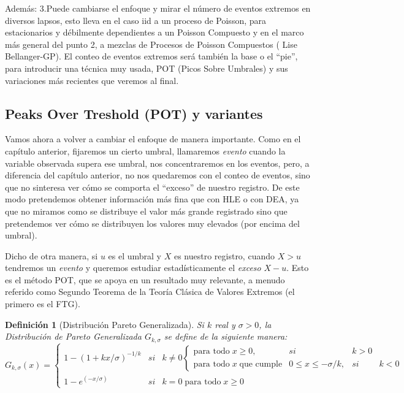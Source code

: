 \documentclass[
  12pt]{article}
\newtheorem{definition}{Definición}[section]
\begin{document}
Además: 3.Puede cambiarse el enfoque y mirar el número de eventos
extremos en diversos lapsos, esto lleva en el caso iid a un proceso de
Poisson, para estacionarios y débilmente dependientes a un Poisson
Compuesto y en el marco más general del punto 2, a mezclas de Procesos
de Poisson Compuestos ( Lise Bellanger-GP). El conteo de eventos
extremos será también la base o el ``pie'', para introducir una técnica
muy usada, POT (Picos Sobre Umbrales) y sus variaciones más recientes
que veremos al final.

\newpage

\subsection{Peaks Over Treshold (POT) y
variantes}\label{peaks-over-treshold-pot-y-variantes}

Vamos ahora a volver a cambiar el enfoque de manera importante. Como en
el capítulo anterior, fijaremos un cierto umbral, llamaremos
\emph{evento} cuando la variable observada supera ese umbral, nos
concentraremos en los eventos, pero, a diferencia del capítulo anterior,
no nos quedaremos con el conteo de eventos, sino que no sinteresa ver
cómo se comporta el ``exceso'' de nuestro registro. De este modo
pretendemos obtener información más fina que con HLE o con DEA, ya que
no miramos como se distribuye el valor más grande registrado sino que
pretendemos ver cómo se distribuyen los valores muy elevados (por encima
del umbral).

Dicho de otra manera, si \(u\) es el umbral y \(X\) es nuestro registro,
cuando \(X>u\) tendremos un \emph{evento} y queremos estudiar
estadísticamente el \emph{exceso} \(X-u\). Esto es el método POT, que se
apoya en un resultado muy relevante, a menudo referido como Segundo
Teorema de la Teoría Clásica de Valores Extremos (el primero es el FTG).

\begin{definition}[Distribución Pareto Generalizada]
Si $k$ real y $\sigma>0$, la Distribución de Pareto Generalizada $G_{k,\sigma}$ se define de la siguiente manera:\\
\begin{equation}
G_{k,\sigma}(x)=\left\{\begin{matrix}
 1-(1+kx/\sigma)^{-1/k}& si & k\neq 0 \left\{\begin{matrix}
\text{para todo} \;x\geq 0 , & si & k>0\\ 
\text{para todo}\; x \;\text{que cumple}&
0\leq x \leq  -\sigma/k, &si& k<0
\end{matrix}\right.\\ 
 1-e^{(-x/\sigma)} & si& k =0\; \text{para todo}\; x\geq 0
\end{matrix}\right. 
\end{equation}
\end{definition}
\end{document}

